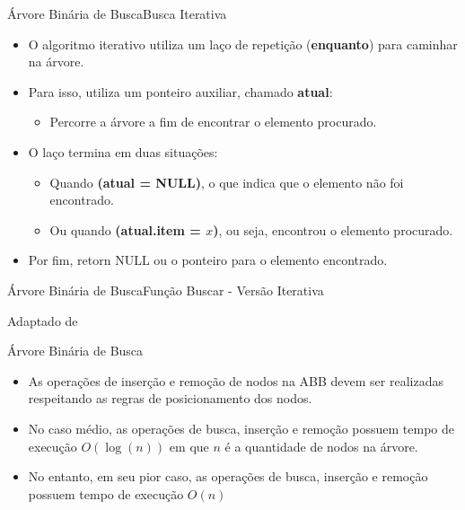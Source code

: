 \documentclass[aspectratio=169]{beamer}
\begin{document}

\begin{frame}{Árvore Binária de Busca}{Busca Iterativa}
\begin{itemize}
 \item O algoritmo iterativo utiliza um laço de repetição ({\bf enquanto}) para caminhar na árvore.
 \item Para isso, utiliza um ponteiro auxiliar, chamado {\bf atual}:
\begin{itemize}
\item Percorre a árvore a fim de encontrar o elemento procurado.
\end{itemize}
\item O laço termina em duas situações:
\begin{itemize}
\item Quando {\bf (atual = NULL)}, o que indica que o elemento não foi encontrado.
\item Ou quando {\bf (atual.item = $x$)}, ou seja, encontrou o elemento procurado.
\end{itemize}
\item Por fim, retorn NULL ou o ponteiro para o elemento encontrado.
\end{itemize}
\end{frame}

\begin{frame}{Árvore Binária de Busca}{Função Buscar - Versão Iterativa}

\tiny{Adaptado de \cite{Backes2016}}
\end{frame}


\begin{frame}{Árvore Binária de Busca}
\begin{itemize}
 \item As operações de inserção e remoção de nodos na ABB devem ser realizadas respeitando as regras de posicionamento dos nodos.
 \item No caso médio, as operações de busca, inserção e remoção possuem tempo de execução $O(\log(n))$ em que $n$ é a quantidade de nodos na árvore.
 \item No entanto, em seu pior caso, as operações de busca, inserção e remoção possuem tempo de execução $O(n)$
\end{itemize}
\end{frame}
\end{document}
